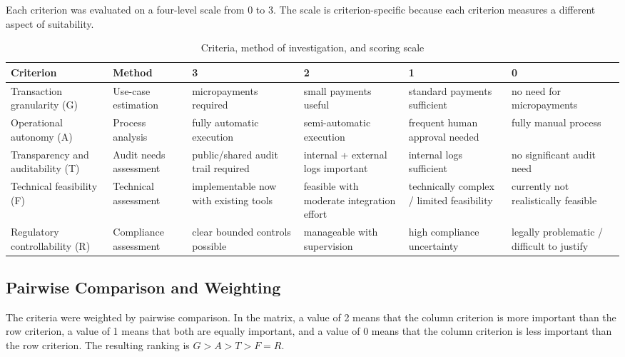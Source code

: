 \documentclass[12pt,a4paper,oneside]{article}
\theoremstyle{definition}
\theoremstyle{plain}
\begin{document}
Each criterion was evaluated on a four-level scale from 0 to 3. The scale is criterion-specific because each criterion measures a different aspect of suitability.

\begin{table}[H]
\centering
\caption{Criteria, method of investigation, and scoring scale}
\label{tab:scoring_scale}

\begin{adjustbox}{max width=\textwidth}
\begin{tabular}{p{2.6cm}p{2.2cm}p{2.2cm}p{2.2cm}p{2.2cm}p{2.2cm}}
\toprule
\textbf{Criterion} & \textbf{Method} & \textbf{3} & \textbf{2} & \textbf{1} & \textbf{0} \\
\midrule

Transaction granularity (G)
&
Use-case estimation
&
micropayments required
&
small payments useful
&
standard payments sufficient
&
no need for micropayments
\\

Operational autonomy (A)
&
Process analysis
&
fully automatic execution
&
semi-automatic execution
&
frequent human approval needed
&
fully manual process
\\

Transparency and auditability (T)
&
Audit needs assessment
&
public/shared audit trail required
&
internal + external logs important
&
internal logs sufficient
&
no significant audit need
\\

Technical feasibility (F)
&
Technical assessment
&
implementable now with existing tools
&
feasible with moderate integration effort
&
technically complex / limited feasibility
&
currently not realistically feasible
\\

Regulatory controllability (R)
&
Compliance assessment
&
clear bounded controls possible
&
manageable with supervision
&
high compliance uncertainty
&
legally problematic / difficult to justify
\\

\bottomrule
\end{tabular}
\end{adjustbox}
\end{table}

\subsection{Pairwise Comparison and Weighting}

The criteria were weighted by pairwise comparison. In the matrix, a value of 2 means that the column criterion is more important than the row criterion, a value of 1 means that both are equally important, and a value of 0 means that the column criterion is less important than the row criterion. The resulting ranking is \(G > A > T > F = R\).
\end{document}
